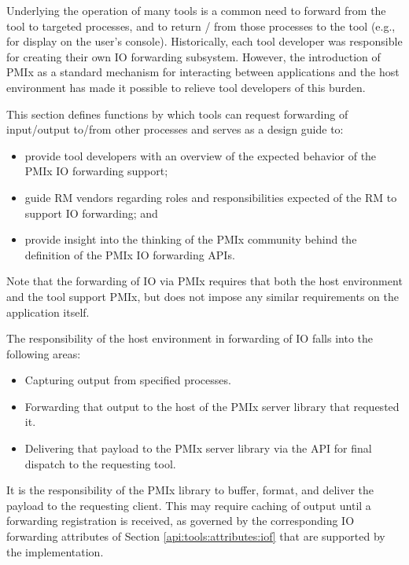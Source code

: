 Underlying the operation of many tools is a common need to forward  from the tool to targeted processes, and to return / from those processes to the tool (e.g., for display on the user’s console). Historically, each tool developer was responsible for creating their own \ac{IO} forwarding subsystem. However, the introduction of \ac{PMIx} as a standard mechanism for interacting between applications and the host environment has made it possible to relieve tool developers of this burden.

This section defines functions by which tools can request forwarding of input/output to/from other processes and serves as a design guide to:

\begin{itemize}
    \item provide tool developers with an overview of the expected behavior of the \ac{PMIx} \ac{IO} forwarding support;
    \item guide \ac{RM} vendors regarding roles and responsibilities expected of the \ac{RM} to support \ac{IO} forwarding; and
    \item provide insight into the thinking of the \ac{PMIx} community behind the definition of the \ac{PMIx} \ac{IO} forwarding \acp{API}.
\end{itemize}

Note that the forwarding of \ac{IO} via \ac{PMIx} requires that both the host environment and the tool support \ac{PMIx}, but does not impose any similar requirements on the application itself.

The responsibility of the host environment in forwarding of \ac{IO} falls into the following areas:

\begin{itemize}
    \item Capturing output from specified processes.
    \item Forwarding that output to the host of the \ac{PMIx} server library that requested it.
    \item Delivering that payload to the \ac{PMIx} server library via the  \ac{API} for final dispatch to the requesting tool.
\end{itemize}

It is the responsibility of the \ac{PMIx} library to buffer, format, and deliver the payload to the requesting client. This may require caching of output until a forwarding registration is received, as governed by the corresponding \ac{IO} forwarding attributes of Section \ref{api:tools:attributes:iof} that are supported by the implementation.


